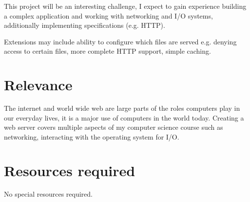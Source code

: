 \documentclass{article}
\begin{document}
This project will be an interesting challenge, I expect to gain experience building a complex application and working with networking and I/O systems, additionally implementing specifications (e.g. HTTP).

Extensions may include ability to configure which files are served e.g. denying access to certain files, more complete HTTP support, simple caching.

\section{Relevance}
\begin{comment}
write a short paragraph to explain how this project relates to your degree course.
\end{comment}
The internet and world wide web are large parts of the roles computers play in our everyday lives, it is a major use of computers in the world today. Creating a web server covers multiple aspects of my computer science course such as networking, interacting with the operating system for I/O.

\section{Resources required}
\begin{comment}
it is your responsibility to make sure that the resources you need are available. Do not expect the department to buy things you need. (If you are going to use something not normally supported by the department you will need to obtain approval from your supervisor.)
\end{comment}
No special resources required.
\begin{comment}
Finally, could you please update your timetable to include timeslots for work related to this project. I would expect around 18 hours per week, preferably during week days and working hours.
\end{comment}
\end{document}
